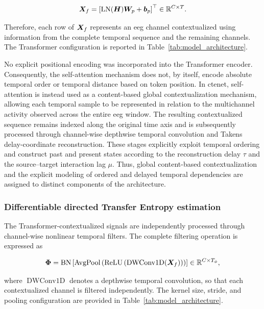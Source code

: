 \begin{equation}
    {\bm{X}}_{f}
    =
    \left[
        \operatorname{LN}({\bm{H}}){\bm{W}}_{p}
        +
        {\bm{b}}_{p}
    \right]^{\top}
    \in\mathbb{R}^{C\times T}.
\end{equation}

Therefore, each row of ${\bm{X}}_{f}$ represents an \gls{eeg} channel contextualized using information from the complete temporal sequence and the remaining channels. The Transformer configuration is reported
in Table~\ref{tab:model_architecture}.

{No explicit positional encoding was incorporated into the Transformer encoder. Consequently, the self-attention mechanism does not, by itself, encode absolute temporal order or temporal distance based on token position. In \gls{ctenet}, self-attention is instead used as a content-based global contextualization mechanism, allowing each temporal sample to be represented in relation to the multichannel activity observed across the entire \gls{eeg} window. The resulting contextualized sequence remains indexed along the original time axis and is subsequently processed through channel-wise depthwise temporal convolution and Takens delay-coordinate reconstruction. These stages explicitly exploit temporal ordering and construct past and present states according to the reconstruction delay $\tau$ and the source--target interaction lag $\mu$. Thus, global content-based contextualization and the explicit modeling of ordered and delayed temporal dependencies are assigned to distinct components of the architecture.}

\subsubsection{Differentiable directed Transfer Entropy estimation}

The Transformer-contextualized signals are independently processed through channel-wise nonlinear temporal filters. The complete filtering operation is expressed as

\begin{equation}
    {\bm{\Phi}}
    =
    \operatorname{BN}
    \left[
        \operatorname{AvgPool}
        \left(
            \operatorname{ReLU}
            \left(
                \operatorname{DWConv1D}({\bm{X}}_{f})
            \right)
        \right)
    \right]
    \in\mathbb{R}^{C\times T_{\phi}},
\end{equation}

where $\operatorname{DWConv1D}$ denotes a depthwise temporal convolution, so that each contextualized channel is filtered independently. The kernel size, stride, and pooling configuration are provided in
Table~\ref{tab:model_architecture}.


